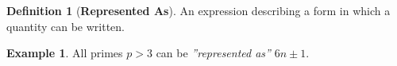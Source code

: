 \documentclass[10pt]{article}
\theoremstyle{plain}
\theoremstyle{definition}
\newtheorem*{defn}{Definition}
\newtheorem*{exmp}{Example}
\theoremstyle{remark}
\begin{document}
\begin{defn}[\textbf{Represented As}]
An expression describing a form in which a quantity can be written.
\end{defn}
\medskip
\begin{exmp}
All primes $p > 3$ can be \textit{''represented as''} $6n \pm 1$.
\end{exmp}
\end{document}
